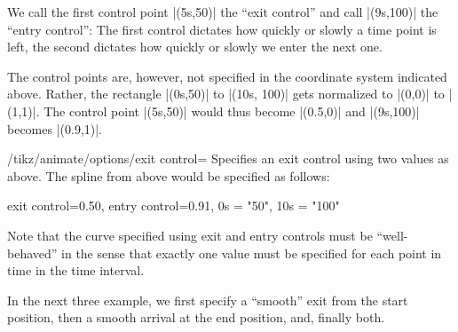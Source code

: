 We call the first control point |(5s,50)| the ``exit control'' and
call |(9s,100)| the ``entry control'': The first control dictates
how quickly or slowly a time point is left, the second dictates how
quickly or slowly we enter the next one.

The control points are, however, not specified in the coordinate
system indicated above. Rather, the rectangle |(0s,50)| to
|(10s, 100)| gets normalized to |(0,0)| to |(1,1)|. The control
point |(5s,50)| would thus become |(0.5,0)| and |(9s,100)| becomes
|(0.9,1)|. 
  
\begin{key}{/tikz/animate/options/exit control=}
  Specifies an exit control using two values as above. The spline
  from above would be specified as follows:

\begin{codeexample}
exit control={0.5}{0},
entry control={0.9}{1},
0s = "50",
10s = "100"
\end{codeexample}

  Note that the curve specified using exit and entry controls must
  be ``well-behaved'' in the sense that exactly one value must be
  specified for each point in time in the time interval.

  In the next three example, we first specify a ``smooth'' exit from
  the start position, then a smooth arrival at the end position,
  and, finally both.
    
\begin{codeexample}[animation list={0.333/\frac{1}{3},0.666/\frac{2}{3},1,1.333/1\frac{1}{3},1.666/1\frac{2}{3}}]
\end{codeexample}

\begin{codeexample}[animation list={0.333/\frac{1}{3},0.666/\frac{2}{3},1,1.333/1\frac{1}{3},1.666/1\frac{2}{3}}]
\end{codeexample}


\end{key}
